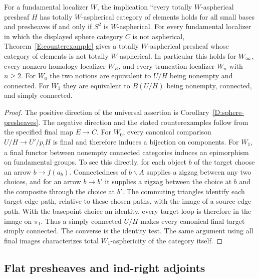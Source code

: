 \begin{corollary}\label{E:localizers}
For a fundamental localizer $W$, the implication ``every totally $W$-aspherical presheaf $H$ has totally $W$-aspherical category of elements holds for all small bases and presheaves if and only if $S^2$ is $W$-aspherical. For every fundamental localizer in which the displayed sphere category $C$ is not aspherical, Theorem~\ref{E:counterexample} gives a totally $W$-aspherical presheaf whose category of elements is not totally $W$-aspherical. In particular this holds for $W_{\infty}$, every nonzero homology localizer $W_R$, and every truncation localizer $W_n$ with $n\geq2$. For $W_0$ the two notions are equivalent to $U/H$ being nonempty and connected. For $W_1$ they are equivalent to $B(U/H)$ being nonempty, connected, and simply connected.
\end{corollary}
\begin{proof}
The positive direction of the universal assertion is Corollary~\ref{D:sphere-presheaves}. The negative direction and the stated counterexamples follow from the specified final map $E\to C$. For $W_0$, every canonical comparison $U/H\to U'/p_!H$ is final and therefore induces a bijection on components. For $W_1$, a final functor between nonempty connected categories induces an epimorphism on fundamental groups. To see this directly, for each object $b$ of the target choose an arrow $b\to f(a_b)$. Connectedness of $b\backslash A$ supplies a zigzag between any two choices, and for an arrow $b\to b'$ it supplies a zigzag between the choice at $b$ and the composite through the choice at $b'$. The commuting triangles identify each target edge-path, relative to these chosen paths, with the image of a source edge-path. With the basepoint choice an identity, every target loop is therefore in the image on $\pi_1$. Thus a simply connected $U/H$ makes every canonical final target simply connected. The converse is the identity test. The same argument using all final images characterizes total $W_1$-asphericity of the category itself.
\end{proof}

\subsection{Flat presheaves and ind-right adjoints}

